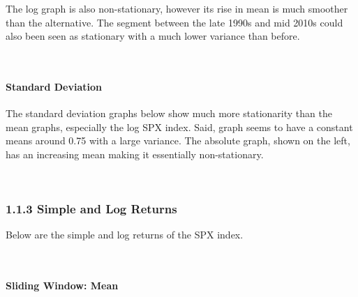\documentclass[11pt]{article}
\begin{document}
The log graph is also non-stationary, however its rise in mean is much
smoother than the alternative. The segment between the late 1990s
and mid 2010s could also been seen as stationary with a much lower
variance than before.

    \begin{center}
    \end{center}
    { \hspace*{\fill} \\}
    
    \hypertarget{standard-deviation}{%
\paragraph{Standard Deviation}\label{standard-deviation2}}

The standard deviation graphs below show much more stationarity than the
mean graphs, especially the log SPX index. Said, graph seems to have a
constant means around 0.75 with a large variance. The absolute graph,
shown on the left, has an increasing mean making it essentially
non-stationary.

    \begin{center}
    \end{center}
    { \hspace*{\fill} \\}
    
    \hypertarget{simple-and-log-returns}{%
\subsubsection{1.1.3 Simple and Log
Returns}\label{simple-and-log-returns}}

Below are the simple and log returns of the SPX index.

    \begin{center}
    \end{center}
    { \hspace*{\fill} \\}
    
    \hypertarget{sliding-window-mean}{%
\paragraph{Sliding Window: Mean}\label{sliding-window-mean}}
\end{document}
